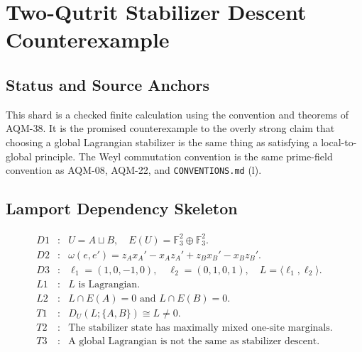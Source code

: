 
\section{Two-Qutrit Stabilizer Descent Counterexample}
\label{sec:two-qutrit-stabilizer-descent-counterexample}

\subsection{Status and Source Anchors}

This shard is a checked finite calculation using the convention and theorems
of AQM-38.  It is the promised counterexample to the overly strong claim that
choosing a global Lagrangian stabilizer is the same thing as satisfying a
local-to-global principle.  The Weyl commutation convention is the same
prime-field convention as AQM-08, AQM-22, and \texttt{CONVENTIONS.md} (l).

\subsection{Lamport Dependency Skeleton}

\[
\begin{array}{rcl}
D1&:&U=A\sqcup B,\quad E(U)=\mathbb F_3^2\oplus\mathbb F_3^2.\\
D2&:&\omega(e,e')=z_Ax_A'-x_Az_A'+z_Bx_B'-x_Bz_B'.\\
D3&:&\ell_1=(1,0,-1,0),\quad \ell_2=(0,1,0,1),\quad
      L=\langle\ell_1,\ell_2\rangle.\\
L1&:&L\text{ is Lagrangian}.\\
L2&:&L\cap E(A)=0\text{ and }L\cap E(B)=0.\\
T1&:&D_U(L;\{A,B\})\cong L\ne0.\\
T2&:&\text{The stabilizer state has maximally mixed
      one-site marginals}.\\
T3&:&\text{A global Lagrangian is not the same as stabilizer descent.}
\end{array}
\]

